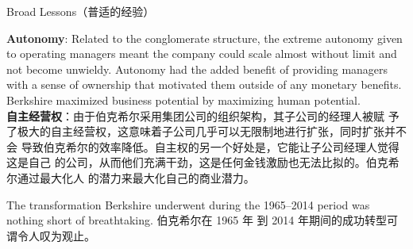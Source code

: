 \begin{section}{Broad Lessons（普适的经验）}
\begin{verseparallel}
  {
    \textbf{Autonomy}: Related to the conglomerate structure, the extreme
    autonomy given to operating managers meant the company could scale almost
    without limit and not become unwieldy. Autonomy had the added benefit of
    providing managers with a sense of ownership that motivated them outside of
    any monetary benefits. Berkshire maximized business potential by maximizing
    human potential. \\
  }
  {
    \textbf{自主经营权}：由于伯克希尔采用集团公司的组织架构，其子公司的经理人被赋
    予了极大的自主经营权，这意味着子公司几乎可以无限制地进行扩张，同时扩张并不会
    导致伯克希尔的效率降低。自主权的另一个好处是，它能让子公司经理人觉得这是自己
    的公司，从而他们充满干劲，这是任何金钱激励也无法比拟的。伯克希尔通过最大化人
    的潜力来最大化自己的商业潜力。
  }
\end{verseparallel}

\begin{verseparallel}
  {
    The transformation Berkshire underwent during the 1965–2014 period was
    nothing short of breathtaking.
  }
  {
    伯克希尔在 1965 年 到 2014 年期间的成功转型可谓令人叹为观止。
  }
\end{verseparallel}

\end{section}

\theendnotes{}

